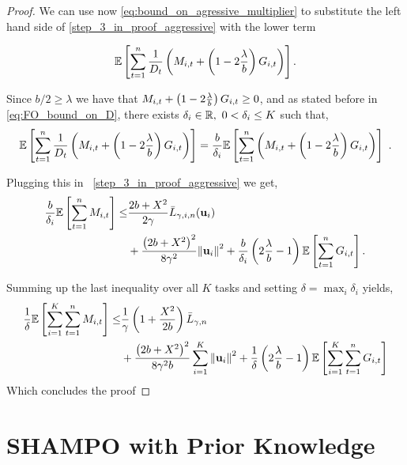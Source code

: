 {\begin{proof}
\noindent
We can use now \eqref{eq:bound_on_agressive_multiplier} to substitute the left hand 
side of \eqref{step_3_in_proof_aggressive} with the lower term

\begin{equation*}
\mathbb{E}\left[{
  \sum_{t=1}^{n}{\frac{1}{D_{t}}}\left({M_{i,t}+\left({1-2\frac{\lambda}{b}}\right)G_{i,t}}\right)}\right].
\end{equation*}

\noindent
Since $b/2 \geq \lambda$ we have that
$M_{i,t}+\left({1-2\frac{\lambda}{b}}\right)G_{i,t}\geq 0$,  and as stated before in \eqref{eq:FO_bound_on_D}, 
there exists $\delta_i\in\mathbb{R},~ 0<\delta_i\le K$ such that, 
\begin{equation*}
\mathbb{E}\left[
  \sum_{t=1}^{n}{\frac{1}{D_{t}}}\left({M_{i,t}+\left({1-2\frac{\lambda}{b}}\right)G_{i,t}
  }\right) \right]=\frac{b}{\delta_i}\mathbb{E}\left[
  \sum_{t=1}^{n}\left({M_{i,t}+\left({1-2\frac{\lambda}{b}}\right)G_{i,t}
  }\right) \right] ~.
\end{equation*}

\noindent
Plugging this in ~\eqref{step_3_in_proof_aggressive} we get,
\begin{equation*}
\begin{split}
\frac{b}{\delta_i}\mathbb{E}\left[{\sum_{t=1}^{n}{M_{i,t}}}\right]
\le& \frac{2b+X^2}{2\gamma}{\bar L}_{\gamma,i,n}(\mathbf{u}_{i})\\
&+\frac{\left({2b+X^2}\right)^2}{8{\gamma}^2}{\left\Vert \mathbf{u}_{i} \right\Vert}^2+ 
     \frac{b}{\delta_i}\left({2\frac{\lambda}{b}-1}\right)\mathbb{E}\left[{\sum_{t=1}^{n}{G_{i,t}}}\right].
\end{split}
\end{equation*}

\noindent
Summing up the last inequality over all $K$ tasks and setting $\delta
= \max_i \delta_i$ yields,
\begin{equation*}
\begin{split}
\frac{1}{\delta}\mathbb{E}\left[ \sum_{i=1}^{K}\sum_{t=1}^{n}{M_{i,t}} \right]
\le&\frac{1}{\gamma}\left(1+\frac{X^2}{2b} \right){\bar L}_{\gamma,n}\\
&+\frac{\left({2b+X^2}\right)^2}{8{\gamma}^2b}\sum_{i=1}^{K}{{\left\Vert \mathbf{u}_{i} \right\Vert}^2}+ \frac{1}{\delta}\left({2\frac{\lambda}{b}-1}\right)\mathbb{E}\left[{\sum_{i=1}^{K}\sum_{t=1}^{n}{G_{i,t}}}\right]
\end{split}
\end{equation*}
Which concludes the proof
\QED
\end{proof}

\section{SHAMPO with Prior Knowledge}

}

